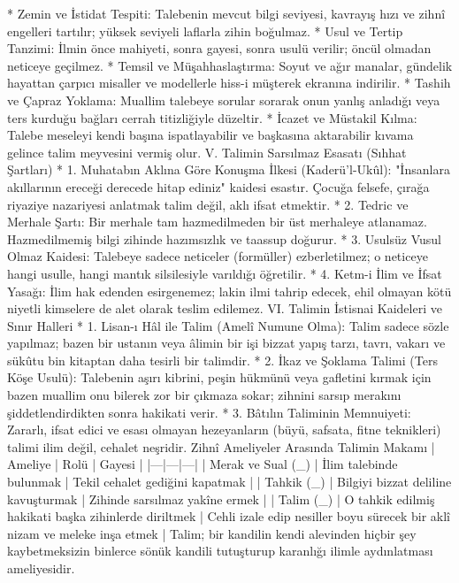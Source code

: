 \documentclass[11pt,a4paper]{article}
\begin{document}
 * Zemin ve İstidat Tespiti: Talebenin mevcut bilgi seviyesi, kavrayış hızı ve zihnî engelleri tartılır; yüksek seviyeli laflarla zihin boğulmaz.
 * Usul ve Tertip Tanzimi: İlmin önce mahiyeti, sonra gayesi, sonra usulü verilir; öncül olmadan neticeye geçilmez.
 * Temsil ve Müşahhaslaştırma: Soyut ve ağır manalar, gündelik hayattan çarpıcı misaller ve modellerle hiss-i müşterek ekranına indirilir.
 * Tashih ve Çapraz Yoklama: Muallim talebeye sorular sorarak onun yanlış anladığı veya ters kurduğu bağları cerrah titizliğiyle düzeltir.
 * İcazet ve Müstakil Kılma: Talebe meseleyi kendi başına ispatlayabilir ve başkasına aktarabilir kıvama gelince talim meyvesini vermiş olur.
V. Talimin Sarsılmaz Esasatı (Sıhhat Şartları)
 * 1. Muhatabın Aklına Göre Konuşma İlkesi (Kaderü'l-Ukûl):
   "İnsanlara akıllarının ereceği derecede hitap ediniz" kaidesi esastır. Çocuğa felsefe, çırağa riyaziye nazariyesi anlatmak talim değil, aklı ifsat etmektir.
 * 2. Tedric ve Merhale Şartı:
   Bir merhale tam hazmedilmeden bir üst merhaleye atlanamaz. Hazmedilmemiş bilgi zihinde hazımsızlık ve taassup doğurur.
 * 3. Usulsüz Vusul Olmaz Kaidesi:
   Talebeye sadece neticeler (formüller) ezberletilmez; o neticeye hangi usulle, hangi mantık silsilesiyle varıldığı öğretilir.
 * 4. Ketm-i İlim ve İfsat Yasağı:
   İlim hak edenden esirgenemez; lakin ilmi tahrip edecek, ehil olmayan kötü niyetli kimselere de alet olarak teslim edilemez.
VI. Talimin İstisnai Kaideleri ve Sınır Halleri
 * 1. Lisan-ı Hâl ile Talim (Amelî Numune Olma):
   Talim sadece sözle yapılmaz; bazen bir ustanın veya âlimin bir işi bizzat yapış tarzı, tavrı, vakarı ve sükûtu bin kitaptan daha tesirli bir talimdir.
 * 2. İkaz ve Şoklama Talimi (Ters Köşe Usulü):
   Talebenin aşırı kibrini, peşin hükmünü veya gafletini kırmak için bazen muallim onu bilerek zor bir çıkmaza sokar; zihnini sarsıp merakını şiddetlendirdikten sonra hakikati verir.
 * 3. Bâtılın Taliminin Memnuiyeti:
   Zararlı, ifsat edici ve esası olmayan hezeyanların (büyü, safsata, fitne teknikleri) talimi ilim değil, cehalet neşridir.
Zihnî Ameliyeler Arasında Talimin Makamı
| Ameliye | Rolü | Gayesi |
|---|---|---|
| Merak ve Sual (_{}) | İlim talebinde bulunmak | Tekil cehalet gediğini kapatmak |
| Tahkik (_{}) | Bilgiyi bizzat deliline kavuşturmak | Zihinde sarsılmaz yakîne ermek |
| Talim (_{}) | O tahkik edilmiş hakikati başka zihinlerde diriltmek | Cehli izale edip nesiller boyu sürecek bir aklî nizam ve meleke inşa etmek |
Talim; bir kandilin kendi alevinden hiçbir şey kaybetmeksizin binlerce sönük kandili tutuşturup karanlığı ilimle aydınlatması ameliyesidir.
\end{document}
